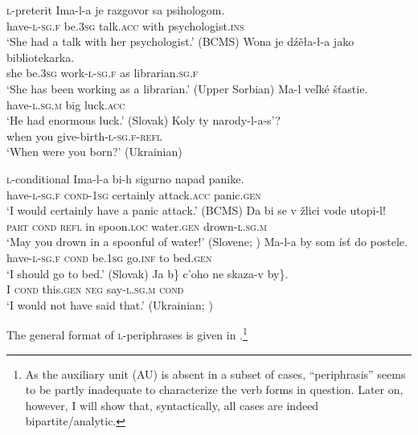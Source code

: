 \documentclass[output=paper]{langscibook}
\begin{document}
\ea \textsc{l-}preterit
\ea\gll Ima-l-a je razgovor sa psihologom.\\
have\textsc{-l-sg.f} be.\textsc{3sg} talk.\textsc{acc} with psychologist.\textsc{ins}\\ 
\glt `She had a talk with her psychologist.' \hfill (BCMS)
\ex\gll Wona je dźěła-ł-a jako bibliotekarka.\\
she be.\textsc{3sg} work\textsc{-l-sg.f} as librarian.\textsc{sg.f}\\ 
\glt `She has been working as a librarian.' \hfill (Upper Sorbian)
\ex\gll Ma-l {veľké šťastie}.\\
have\textsc{-l.sg.m} {big luck.\textsc{acc}}\\ 
\glt `He had enormous luck.' \hfill (Slovak)
\ex\gll Koly ty narody-l-a-s'?\\
when you give-birth\textsc{-l-sg.f-refl}\\ 
\glt `When were you born?' \hfill (Ukrainian)
\z \label{pitsch:ex:perf}
\z

\ea \textsc{l-}conditional
\ea\gll Ima-l-a bi-h sigurno napad panike.\\
have\textsc{-l-sg.f} \textsc{cond-1sg} certainly attack.\textsc{acc} panic.\textsc{gen}\\ 
\glt `I would certainly have a panic attack.' \hfill (BCMS)
\ex\gll Da bi se v žlici vode utopi-l!\\
\textsc{part} \textsc{cond} \textsc{refl} in spoon.\textsc{loc} water.\textsc{gen} drown\textsc{-l.sg.m}\\ 
\glt `May you drown in a spoonful of water!' \hfill \hfill (Slovene; \citealt[431]{Priestly1993})
\ex\gll Ma-l-a by som ísť do postele.\\
have\textsc{-l-sg.f} \textsc{cond} be.\textsc{1sg} go.\textsc{inf} to bed.\textsc{gen}\\ 
\glt `I should go to bed.' \hfill (Slovak)
\ex\gll Ja \minsp{\{} b\} c'oho ne skaza-v \minsp{\{} by\}.\\
I {} \textsc{cond} this.\textsc{gen} \textsc{neg} say\textsc{-l.sg.m} {} \textsc{cond}\\ 
\glt `I would not have said that.' \hfill \hfill (Ukrainian; \citealt[158]{AmirBabenko2007})
\z \label{pitsch:ex:cond}
\z

\noindent The general format of \textsc{l-}periphrases is given in .\footnote{As the auxiliary unit (AU) is absent in a subset of cases, ``periphrasis'' seems to be partly inadequate to characterize the verb forms in question. Later on, however, I will show that, syntactically, all cases are indeed bipartite/analytic.}
\end{document}
